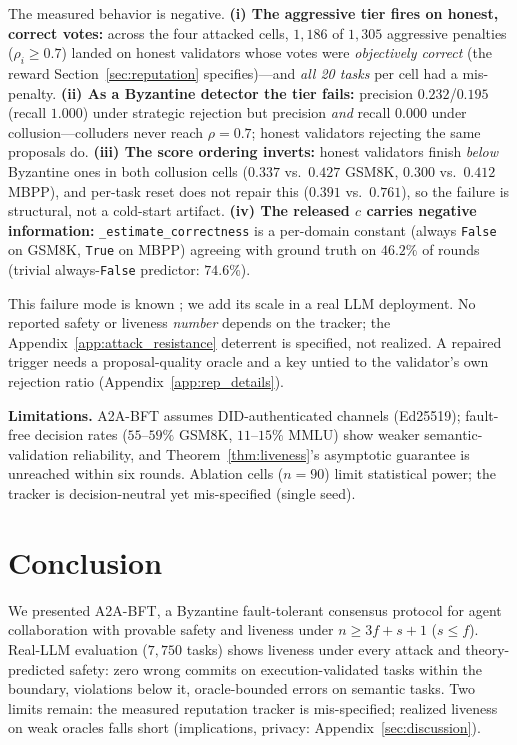 \documentclass{article}
\begin{document}
The measured behavior is negative. \textbf{(i) The aggressive tier fires on honest, correct votes:} across the four attacked cells, $1{,}186$ of $1{,}305$ aggressive penalties ($\rho_i \geq 0.7$) landed on honest validators whose votes were \emph{objectively correct} (the reward Section~\ref{sec:reputation} specifies)---and \emph{all 20 tasks} per cell had a mis-penalty. \textbf{(ii) As a Byzantine detector the tier fails:} precision $0.232$/$0.195$ (recall $1.000$) under strategic rejection but precision \emph{and} recall $0.000$ under collusion---colluders never reach $\rho = 0.7$; honest validators rejecting the same proposals do. \textbf{(iii) The score ordering inverts:} honest validators finish \emph{below} Byzantine ones in both collusion cells ($0.337$ vs.\ $0.427$ GSM8K, $0.300$ vs.\ $0.412$ MBPP), and per-task reset does not repair this ($0.391$ vs.\ $0.761$), so the failure is structural, not a cold-start artifact. \textbf{(iv) The released $c$ carries negative information:} \texttt{\_estimate\_correctness} is a per-domain constant (always \texttt{False} on GSM8K, \texttt{True} on MBPP) agreeing with ground truth on $46.2\%$ of rounds (trivial always-\texttt{False} predictor: $74.6\%$).

This failure mode is known \citep{josang2002beta,josang2007survey,kamvar2003eigentrust}; we add its scale in a real LLM deployment. No reported safety or liveness \emph{number} depends on the tracker; the Appendix~\ref{app:attack_resistance} deterrent is specified, not realized. A repaired trigger needs a proposal-quality oracle and a key untied to the validator's own rejection ratio (Appendix~\ref{app:rep_details}).



\textbf{Limitations.} A2A-BFT assumes DID-authenticated channels (Ed25519); fault-free decision rates ($55$--$59\%$ GSM8K, $11$--$15\%$ MMLU) show weaker semantic-validation reliability, and Theorem~\ref{thm:liveness}'s asymptotic guarantee is unreached within six rounds. Ablation cells ($n{=}90$) limit statistical power; the tracker is decision-neutral yet mis-specified (single seed).

\section{Conclusion}

We presented A2A-BFT, a Byzantine fault-tolerant consensus protocol for agent collaboration with provable safety and liveness under $n \geq 3f + s + 1$ ($s \leq f$). Real-LLM evaluation ($7{,}750$ tasks) shows liveness under every attack and theory-predicted safety: zero wrong commits on execution-validated tasks within the boundary, violations below it, oracle-bounded errors on semantic tasks. Two limits remain: the measured reputation tracker is mis-specified; realized liveness on weak oracles falls short (implications, privacy: Appendix~\ref{sec:discussion}).
\end{document}
